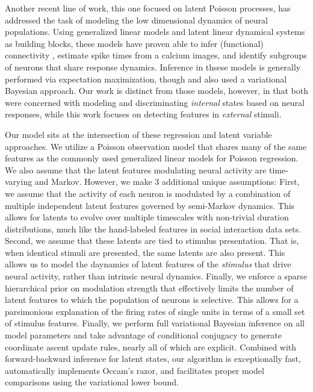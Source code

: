 \documentclass[10pt,letterpaper]{article}
\begin{document}
Another recent line of work, this one focused on latent Poisson processes, has addressed the task of modeling the low dimensional dynamics of neural populations\cite{Pillow2008-em,Vogelstein2009-ax,Park2014-el,Buesing2014-ta}. Using generalized linear models and latent linear dynamical systems as building blocks, these models have proven able to infer (functional) connectivity \cite{Pillow2008-em}, estimate spike times from a calcium images\cite{Vogelstein2009-ax}, and identify subgroups of neurons that share response dynamics\cite{Buesing2014-ta}. Inference in thsese models is generally performed via expectation maximization, though \cite{Ulrich2014-zc} and \cite{Putzky2014-up} also used a variational Bayesian approach. Our work is distinct from those models, however, in that both were concerned with modeling and discriminating \emph{internal} states based on neural responses, while this work focuses on detecting features in \emph{external} stimuli. 

Our model sits at the intersection of these regression and latent variable approaches. We utilize a Poisson observation model that shares many of the same features as the commonly used generalized linear models for Poisson regression. We also assume that the latent features modulating neural activity are time-varying and Markov. However, we make 3 additional unique assumptions: First, we assume that the activity of each neuron is modulated by a combination of multiple independent latent features governed by semi-Markov dynamics. This allows for latents to evolve over multiple timescales with non-trivial duration distributions, much like the hand-labeled features in social interaction data sets. Second, we assume that these latents are tied to stimulus presentation. That is, when identical stimuli are presented, the same latents are also present. This allows us to model the daynamics of latent features of the \emph{stimulus} that drive neural activity, rather than intrinsic neural dynamics. Finally, we enforce a sparse hierarchical prior on modulation strength that effectively limits the number of latent features to which the population of neurons is selective. This allows for a parsimonious explanation of the firing rates of single units in terms of a small set of stimulus features. Finally, we perform full variational Bayesian inference on all model parameters and take advantage of conditional conjugacy to generate coordinate ascent update rules, nearly all of which are explicit. Combined with forward-backward inference for latent states, our algorithm is exceptionally fast, automatically implements Occam's razor, and facilitates proper model comparisons using the variational lower bound.
\end{document}
